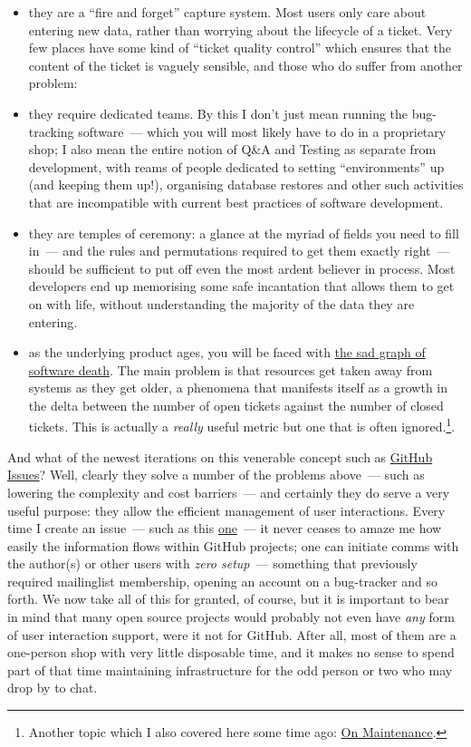 \documentclass{book}
\begin{document}
\begin{itemize}
\item they are a ``fire and forget'' capture system. Most users only care
about entering new data, rather than worrying about the lifecycle of
a ticket. Very few places have some kind of ``ticket quality control''
which ensures that the content of the ticket is vaguely sensible,
and those who do suffer from another problem:
\item they require dedicated teams. By this I don't just mean running the
bug-tracking software~--- which you will most likely have to do in a
proprietary shop; I also mean the entire notion of Q\&A and Testing
as separate from development, with reams of people dedicated to
setting ``environments'' up (and keeping them up!), organising
database restores and other such activities that are incompatible
with current best practices of software development.
\item they are temples of ceremony: a glance at the myriad of fields
  you need to fill in~--- and the rules and permutations required to
  get them exactly right~--- should be sufficient to put off even the
  most ardent believer in process. Most developers end up memorising
  some safe incantation that allows them to get on with life, without
  understanding the majority of the data they are entering.
\item as the underlying product ages, you will be faced with \href{http://tinyletter.com/programming-beyond-practices/letters/the-sad-graph-of-software-death}{the sad graph
of software death}. The main problem is that resources get taken away
from systems as they get older, a phenomena that manifests itself as
a growth in the delta between the number of open tickets against the
number of closed tickets. This is actually a \emph{really} useful metric
but one that is often ignored.\footnote{Another topic which I also covered here some time
ago: \href{http://mcraveiro.blogspot.co.uk/2007/05/nerd-food-on-maintenance.html}{On Maintenance}.}.
\end{itemize}

And what of the newest iterations on this venerable concept such as
\href{https://guides.github.com/features/issues/}{GitHub Issues}?
Well, clearly they solve a number of the problems above~--- such as
lowering the complexity and cost barriers~--- and certainly they do
serve a very useful purpose: they allow the efficient management of
user interactions. Every time I create an issue~--- such as this
\href{https://github.com/flycheck/flycheck/issues/852}{one}~--- it
never ceases to amaze me how easily the information flows within
GitHub projects; one can initiate comms with the author(s) or other
users with \emph{zero setup}~--- something that previously required
mailinglist membership, opening an account on a bug-tracker and so
forth. We now take all of this for granted, of course, but it is
important to bear in mind that many open source projects would
probably not even have \emph{any} form of user interaction support,
were it not for GitHub. After all, most of them are a one-person shop
with very little disposable time, and it makes no sense to spend part
of that time maintaining infrastructure for the odd person or two who
may drop by to chat.
\end{document}

